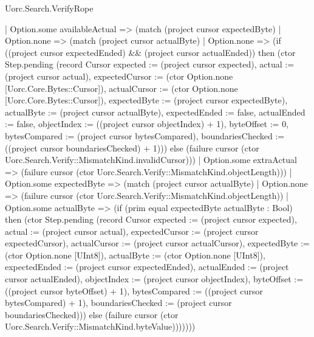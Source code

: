 \begin{lexlean}{Uorc.Search.VerifyRope}
\begin{semanticmodule}
{      | Option.some availableActual => (match (project cursor expectedByte)
        | Option.none => (match (project cursor actualByte)
          | Option.none => (if ((project cursor expectedEnded) && (project cursor actualEnded)) then (ctor Step.pending (record Cursor {expected := (project cursor expected), actual := (project cursor actual), expectedCursor := (ctor Option.none [Uorc.Core.Bytes::Cursor]), actualCursor := (ctor Option.none [Uorc.Core.Bytes::Cursor]), expectedByte := (project cursor expectedByte), actualByte := (project cursor actualByte), expectedEnded := false, actualEnded := false, objectIndex := ((project cursor objectIndex) + 1), byteOffset := 0, bytesCompared := (project cursor bytesCompared), boundariesChecked := ((project cursor boundariesChecked) + 1)})) else (failure cursor (ctor Uorc.Search.Verify::MismatchKind.invalidCursor)))
          | Option.some extraActual => (failure cursor (ctor Uorc.Search.Verify::MismatchKind.objectLength)))
        | Option.some expectedByte => (match (project cursor actualByte)
          | Option.none => (failure cursor (ctor Uorc.Search.Verify::MismatchKind.objectLength))
          | Option.some actualByte => (if (prim equal expectedByte actualByte : Bool) then (ctor Step.pending (record Cursor {expected := (project cursor expected), actual := (project cursor actual), expectedCursor := (project cursor expectedCursor), actualCursor := (project cursor actualCursor), expectedByte := (ctor Option.none [UInt8]), actualByte := (ctor Option.none [UInt8]), expectedEnded := (project cursor expectedEnded), actualEnded := (project cursor actualEnded), objectIndex := (project cursor objectIndex), byteOffset := ((project cursor byteOffset) + 1), bytesCompared := ((project cursor bytesCompared) + 1), boundariesChecked := (project cursor boundariesChecked)})) else (failure cursor (ctor Uorc.Search.Verify::MismatchKind.byteValue)))))))
}


\end{semanticmodule}
\end{lexlean}
